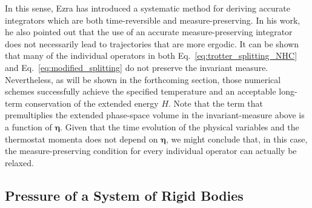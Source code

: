 \documentclass[aip,jcp,reprint,amsmath,amssymb]{revtex4-1}
\newcommand{\vt}[1]{\boldsymbol{\mathbf{#1}}}           %
\begin{document}
In this sense, Ezra \cite{Ezra2006} has introduced a systematic method for deriving accurate integrators which are both time-reversible and measure-preserving. In his work, he also pointed out that the use of an accurate measure-preserving integrator does not necessarily lead to trajectories that are more ergodic. It can be shown that many of the individual operators in both Eq.~\ref{eq:trotter_splitting_NHC} and Eq.~\ref{eq:modified_splitting} do not preserve the invariant measure. Nevertheless, as will be shown in the forthcoming section, those numerical schemes successfully achieve the specified temperature and an acceptable long-term conservation of the extended energy $H$. Note that the term that premultiplies the extended phase-space volume in the invariant-measure above is a function of $\vt \eta$. Given that the time evolution of the physical variables and the thermostat momenta does not depend on $\vt \eta$, we might conclude that, in this case, the measure-preserving condition for every individual operator can actually be relaxed.

\subsection{Pressure of a System of Rigid Bodies}
\label{sec:pressure}
\end{document}
